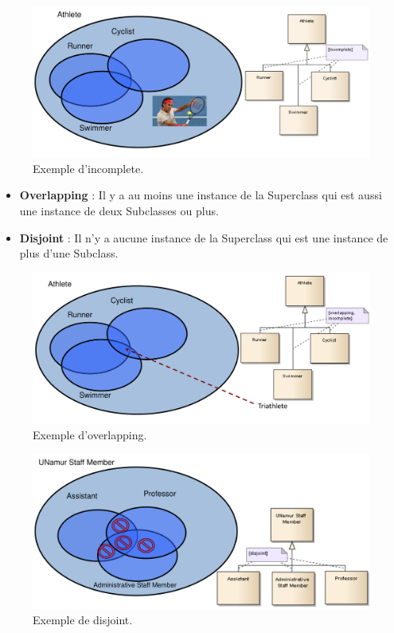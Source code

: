 \documentclass[../Syllabus.tex]{subfiles}
\begin{document}
\begin{figure}[htp]
    \centering
    \includegraphics[width=14cm]{./img/chapter2-incomplete.png}
    \caption{Exemple d'incomplete.}
    \label{fig:chapter2-incomplete}
\end{figure}

\begin{itemize}
  \item \textbf{Overlapping} : Il y a au moins une instance de la Superclass qui est aussi une instance de deux Subclasses ou plus.
  \item \textbf{Disjoint} : Il n'y a aucune instance de la Superclass qui est une instance de plus d'une Subclass.
\end{itemize}

\begin{figure}[htp]
    \centering
    \includegraphics[width=14cm]{./img/chapter2-overlapping.png}
    \caption{Exemple d'overlapping.}
    \label{fig:chapter2-overlapping}
\end{figure}

\begin{figure}[htp]
    \centering
    \includegraphics[width=14cm]{./img/chapter2-disjoint.png}
    \caption{Exemple de disjoint.}
    \label{fig:chapter2-generalisation}
\end{figure}
\end{document}
